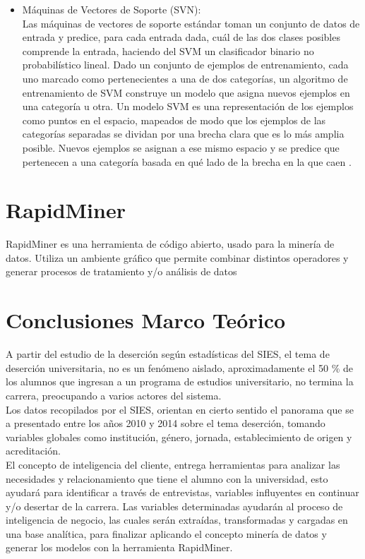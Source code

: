 \begin{itemize}
	\item Máquinas de Vectores de Soporte (SVN):\\

Las máquinas de vectores de soporte estándar toman un conjunto de datos de entrada y predice, para cada entrada dada, cuál de las dos clases posibles comprende la entrada, haciendo del SVM un clasificador binario no probabilístico lineal. Dado un conjunto de ejemplos de entrenamiento, cada uno marcado como pertenecientes a una de dos categorías, un algoritmo de entrenamiento de SVM construye un modelo que asigna nuevos ejemplos en una categoría u otra. Un modelo SVM es una representación de los ejemplos como puntos en el espacio, mapeados de modo que los ejemplos de las categorías separadas se dividan por una brecha clara que es lo más amplia posible. Nuevos ejemplos se asignan a ese mismo espacio y se predice que pertenecen a una categoría basada en qué lado de la brecha en la que caen \cite{svn}.

\end{itemize}  

\section{RapidMiner}

RapidMiner es una herramienta de código abierto, usado para la minería de datos. Utiliza un ambiente gráfico que permite combinar distintos operadores y generar procesos de tratamiento y/o análisis de datos\\

\section{Conclusiones Marco Teórico}

A partir del estudio de la deserción según estadísticas del SIES, el tema de deserción universitaria, no es un fenómeno aislado, aproximadamente el 50 \%  de los alumnos que ingresan a un programa de estudios universitario, no termina la carrera, preocupando a varios actores del sistema.\\

Los datos recopilados por el SIES, orientan en cierto sentido el panorama que se a presentado entre los años 2010 y 2014 sobre el tema deserción, tomando variables globales como institución, género, jornada, establecimiento de origen y acreditación.\\

El concepto de inteligencia del cliente, entrega herramientas para analizar las necesidades y relacionamiento que tiene el alumno con la universidad, esto ayudará para identificar a través de entrevistas, variables influyentes en continuar y/o desertar de la carrera. Las variables determinadas ayudarán al proceso de inteligencia de negocio, las cuales serán extraídas, transformadas y cargadas en una base analítica, para finalizar aplicando el concepto minería de datos y generar los modelos con la herramienta RapidMiner.












